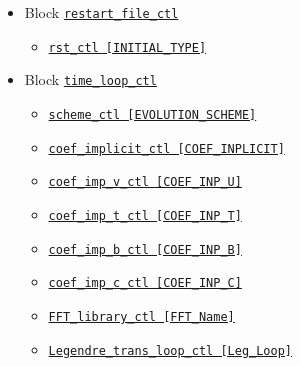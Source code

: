 \begin{itemize}
\begin{itemize}
\begin{itemize}
			{\tt i\_step\_finish\_ctl      [ISTEP\_FINISH]}
		\item \hyperref[href_t:i_step_check_ctl]
			{\tt i\_step\_check\_ctl       [ISTEP\_MONITOR]}
		\item \hyperref[href_t:i_step_rst_ctl]
			{\tt i\_step\_rst\_ctl         [ISTEP\_RESTART]}
		\item \hyperref[href_t:i_step_field_ctl]
			{\tt i\_step\_field\_ctl       [ISTEP\_FIELD]}
		\item \hyperref[href_t:i_step_sectioning_ctl]
			{\tt i\_step\_sectioning\_ctl  [ISTEP\_SECTION]}
		\item \hyperref[href_t:i_step_isosurface_ctl]
			{\tt i\_step\_isosurface\_ctl  [ISTEP\_ISOSURFACE]}
		\item \hyperref[href_t:dt_ctl]
			{\tt dt\_ctl                   [DELTA\_TIME]}
		\item \hyperref[href_t:time_init_ctl]
			{\tt time\_init\_ctl           [INITIAL\_TIME]}
		\end{itemize}
%
	\item Block \hyperref[href_t:restart_file_ctl]{\tt restart\_file\_ctl}
		\begin{itemize} \label{href_i:restart_file_ctl}
		\item \hyperref[href_t:rst_ctl]{\tt rst\_ctl      [INITIAL\_TYPE]}
		\end{itemize}
%
	\item Block \verb||
    		\hyperref[href_t:time_loop_ctl]{\tt time\_loop\_ctl}
		\begin{itemize} \label{href_i:time_loop_ctl}
		\item \hyperref[href_t:scheme_ctl]{\tt scheme\_ctl              [EVOLUTION\_SCHEME]}
        \item \hyperref[href_t:coef_implicit_ctl]{\tt coef\_implicit\_ctl    [COEF\_INPLICIT]}
		\item \hyperref[href_t:coef_imp_v_ctl]{\tt coef\_imp\_v\_ctl    [COEF\_INP\_U]}
		\item \hyperref[href_t:coef_imp_t_ctl]{\tt coef\_imp\_t\_ctl    [COEF\_INP\_T]}
		\item \hyperref[href_t:coef_imp_b_ctl]{\tt coef\_imp\_b\_ctl    [COEF\_INP\_B]}
		\item \hyperref[href_t:coef_imp_c_ctl]{\tt coef\_imp\_c\_ctl    [COEF\_INP\_C]}
		\item \hyperref[href_t:FFT_library_ctl]{\tt FFT\_library\_ctl   [FFT\_Name]}
		\item \hyperref[href_t:Legendre_trans_loop_ctl]
			{\tt Legendre\_trans\_loop\_ctl [Leg\_Loop]}

\end{itemize}
\end{itemize}
\end{itemize}
